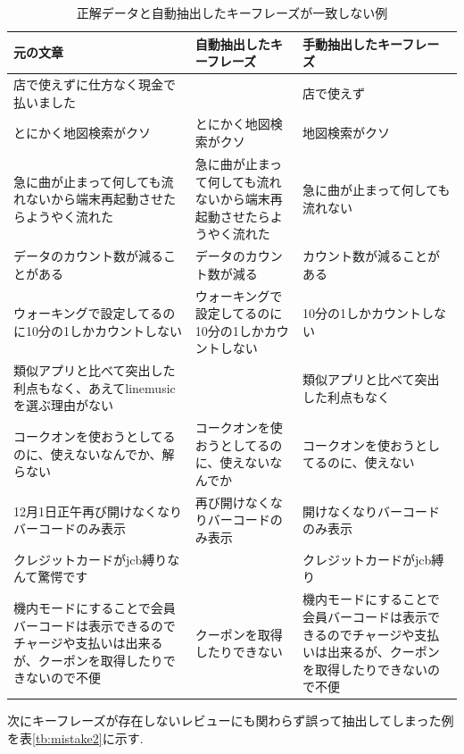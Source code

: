 \begin{table}[H]
  \caption{ 正解データと自動抽出したキーフレーズが一致しない例 }
  \small
  \label{tb:mistake}
  \begin{center}
  \begin{tabularx}{\linewidth}{X|X|X}
    \hline
    元の文章&自動抽出したキーフレーズ&手動抽出したキーフレーズ\\\hline\hline
    店で使えずに仕方なく現金で払いました&&店で使えず\\\hline
    とにかく地図検索がクソ&とにかく地図検索がクソ&地図検索がクソ\\\hline
    急に曲が止まって何しても流れないから端末再起動させたらようやく流れた&急に曲が止まって何しても流れないから端末再起動させたらようやく流れた&急に曲が止まって何しても流れない\\\hline
    データのカウント数が減ることがある&データのカウント数が減る&カウント数が減ることがある\\\hline
    ウォーキングで設定してるのに10分の1しかカウントしない&ウォーキングで設定してるのに10分の1しかカウントしない&10分の1しかカウントしない\\\hline
    類似アプリと比べて突出した利点もなく、あえてlinemusicを選ぶ理由がない&&類似アプリと比べて突出した利点もなく\\\hline
    コークオンを使おうとしてるのに、使えないなんでか、解らない&コークオンを使おうとしてるのに、使えないなんでか&コークオンを使おうとしてるのに、使えない\\\hline
    12月1日正午再び開けなくなりバーコードのみ表示&再び開けなくなりバーコードのみ表示&開けなくなりバーコードのみ表示\\\hline
    クレジットカードがjcb縛りなんて驚愕です&&クレジットカードがjcb縛り\\\hline
    機内モードにすることで会員バーコードは表示できるのでチャージや支払いは出来るが、クーポンを取得したりできないので不便&クーポンを取得したりできない&機内モードにすることで会員バーコードは表示できるのでチャージや支払いは出来るが、クーポンを取得したりできないので不便\\\hline
  \end{tabularx}\end{center}
\end{table}

次にキーフレーズが存在しないレビューにも関わらず誤って抽出してしまった例を表\ref{tb:mistake2}に示す.


